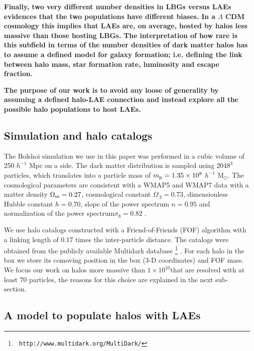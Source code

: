 \documentclass[usenatbib]{mn2e}
\newcommand{\ly}{{\ifmmode{{\rm Ly}\alpha}\else{Ly$\alpha$~}\fi}}
\newcommand{\hMsun}{{\ifmmode{h^{-1}{\rm
        {M_{\odot}}}}\else{$h^{-1}{\rm{M_{\odot}}}$}\fi}}
\begin{document}
{\bf Finally, two very different number densities in LBGs versus LAEs evidences
  that the two populations have different biases. In a $\Lambda$ CDM
  cosmology this implies that LAEs are, on average, hosted by halos
  less massive than those hosting LBGs. The interpretation of how rare
  is this subfield in terms of the number densities of dark matter
  halos has to assume a defined model for galaxy formation;
  i.e. defining the link between halo mass, star formation rate, \ly
  luminosity and \ly escape fraction.} 

{\bf The purpose of our work is to avoid any loose of generality by
  assuming a defined halo-LAE connection and instead explore all the
  possible halo populations to host LAEs.}


\subsection{Simulation and halo catalogs}

The Bolshoi simulation \citep{Bolshoi} we use in this paper was
performed in a cubic volume of 250 $h^{-1}$ Mpc on a side. The
dark matter distribution is sampled using $2048^{3}$ particles, which
translates into a particle mass of $m_{\rm   p}=1.35\times 10^{8}$
$h^{-1}$ M$_{\odot}$.  The cosmological parameters are consistent with
a WMAP5 and WMAP7 data with a matter density $\Omega_{\rm m} = 0.27$,
cosmological constant $\Omega_{\Lambda}=0.73$, dimensionless Hubble constant
$h=0.70$, slope of the power spectrum $n=0.95$ and normalization of the
power spectrum$\sigma_{8}=0.82$ \citep{Komatsu2009,Jarosik2011}.  

We use halo catalogs constructed with a Friend-of-Friends (FOF)
algorithm with a linking length of 0.17 times the inter-particle
distance. The catalogs were obtained from the publicly available
Multidark database \footnote{{\tt
    http://www.multidark.org/MultiDark/}}
\citep{MultiDark}. For each halo in the box we store its
comoving position in the box (3-D coordinates) and FOF mass. We focus our work
on halos more massive than $1\times 10^{10}$\hMsun that are resolved
with at least $70$ particles, the reasons for this choice are
explained in the next sub-section.  


\subsection{A model to populate halos with LAEs}
\label{subsec:mocks}
\end{document}
